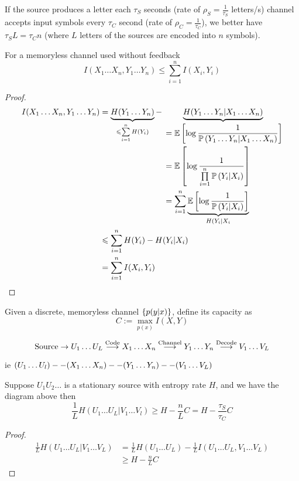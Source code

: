 If the source produces a letter each $\tau_S$ seconds (rate of $\rho_S = \frac{1}{\tau_S}$ letters/s) channel accepts input symbols every $\tau_C$ second (rate of $\rho_C = \frac{1}{\tau_C}$), we better have $\tau_S L = \tau_C n$ (where $L$ letters of the sources are encoded into $n$ symbols).

\begin{proposition}
    For a memoryless channel used without feedback 
    \[
        I(X_1\ldots X_n , Y_1 \ldots Y_n) \leqslant \sum\limits_{i=1}^n I(X_i, Y_i)
    \]
\end{proposition}
\begin{proof}
    \[
        \begin{aligned}
            I(X_1\ldots X_n , Y_1 \ldots Y_n) &= \underbrace{H(Y_1\ldots Y_n)}_{\leqslant \sum\limits_{i=1}^n H(Y_i)} - \underbrace{H(Y_1 \ldots Y_n \vert X_1 \ldots X_n)}_{ \begin{aligned}&= \mathbb{E}\left[ \log\frac{1}{\mathbb{P}\left( Y_1\ldots Y_n\vert X_1\ldots X_n \right)} \right]\\&=\mathbb{E}\left[ \log\frac{1}{\prod\limits_{i=1}^n \mathbb{P}\left( Y_i\vert X_i \right)} \right]\\&=\sum\limits_{i=1}^n\underbrace{\mathbb{E}\left[ \log\frac{1}{\mathbb{P}\left( Y_i\vert X_i \right)} \right]}_{H(Y_i\vert X_i}\end{aligned}}\\
            &\leqslant \sum\limits_{i=1}^n H(Y_i) - H(Y_i \vert X_i)\\
            &=\sum\limits_{i=1}^nI(X_i,Y_i)
        \end{aligned}            
    \]
\end{proof}

\begin{definition}
    Given a discrete, memoryless channel $\left\{ p(y\vert x) \right\}$, define its capacity as
    \[
        C := \max\limits_{p(x)} I(X,Y)
    \]
\end{definition}

\[
    \text{Source} \rightarrow U_1\ldots U_L \overset{\text{Code}}{\longrightarrow} X_1\ldots X_n\overset{\text{Channel}}{\longrightarrow} Y_1\ldots Y_n \overset{\text{Decode}}{\longrightarrow} V_1\ldots V_L
\]

ie $(U_1\ldots U_l) \--- (X_1\ldots X_n) \--- (Y_1\ldots Y_n) \--- (V_1\ldots V_L)$

\begin{theorem}
    Suppose $U_1U_2\ldots$ is a stationary source with entropy rate $H$, and we have the diagram above then
    \[
        \frac{1}{L} H(U_1\ldots U_L\vert V_1\ldots V_l) \geqslant H - \frac{n}{L} C = H - \frac{\tau_S}{\tau_C} C
    \]
\end{theorem}
\begin{proof}
    \[
        \begin{aligned}
            \frac{1}{L} H(U_1\ldots U_L \vert V_1 \ldots V_L) &= \frac{1}{L} H(U_1\ldots U_L) - \frac{1}{L} I(U_1\ldots U_L,V_1\ldots V_L)\\
            & \geqslant H - \frac{n}{L} C
        \end{aligned}
    \]
\end{proof}

